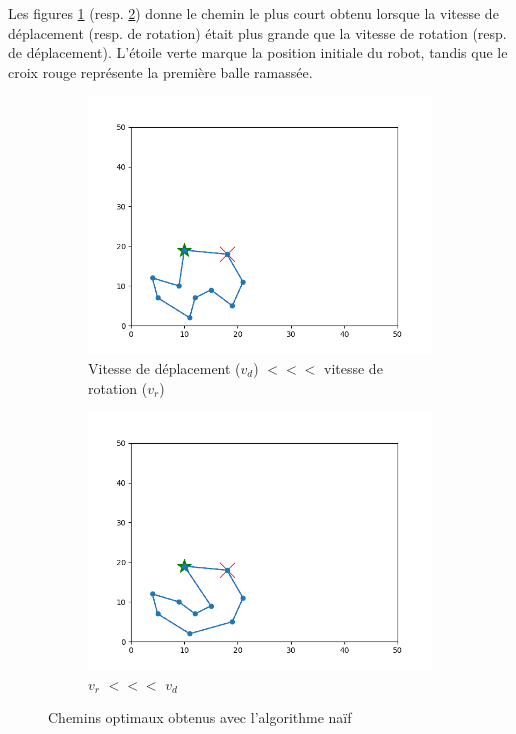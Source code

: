 \documentclass[12pt]{article}
\begin{document}
    Les figures \ref{subfig:terrain3od} (resp. \ref{subfig:terrain3or}) donne le chemin le plus court obtenu lorsque la vitesse de déplacement (resp. de rotation) était plus grande que la vitesse de rotation (resp. de déplacement). L'étoile verte marque la position initiale du robot, tandis que le croix rouge représente la première balle ramassée.

    \begin{figure}[H]
        \centering
        \begin{subfigure}{0.35\textwidth}
          \centering
          \includegraphics[width=\linewidth]{img/3od}
          \caption{Vitesse de déplacement ($v_d$) $<<<$ vitesse de rotation ($v_r$)}
          \label{subfig:terrain3od}
        \end{subfigure}
        \hfill
        \begin{subfigure}{0.35\textwidth}
          \centering
          \includegraphics[width=\linewidth]{img/3or}
          \caption{$v_r$ $<<<$ $v_d$}
          \label{subfig:terrain3or}
        \end{subfigure}
        \caption{Chemins optimaux obtenus avec l'algorithme naïf}
        \label{fig:terrain3opt}
    \end{figure}
\end{document}
